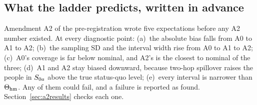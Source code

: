\subsection{What the ladder predicts, written in advance}\label{sec:expectations}

Amendment A2 of the pre-registration wrote five expectations before any A2
number existed. At every diagnostic point:
(a)~the absolute bias falls from A0 to A1 to A2;
(b)~the sampling SD and the interval width rise from A0 to A1 to A2;
(c)~A0's coverage is far below nominal, and A2's is the closest to nominal of the
three;
(d)~A1 and A2 stay biased downward, because two-hop spillover raises the people
in $S_{0a}$ above the true status-quo level;
(e)~every interval is narrower than $\Theta_{\mathrm{hm}}$.
Any of them could fail, and a failure is reported as found.
Section~\ref{sec:a2results} checks each one.
